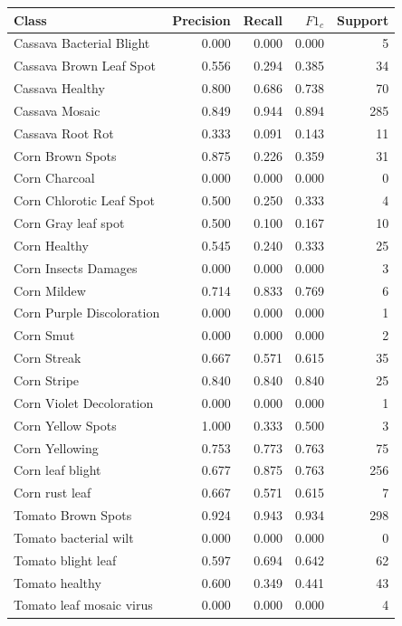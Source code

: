 \documentclass[a4paper,8pt]{article}
\begin{document}
\begin{table}[H]
\centering
\scriptsize
\renewcommand{\arraystretch}{1.1}
\begin{tabularx}{0.92\textwidth}{|>{\raggedright\arraybackslash}X|r|r|r|r|}
\hline
\textbf{Class} & \textbf{Precision} & \textbf{Recall} & \textbf{$F1_c$} & \textbf{Support}\\
\hline
Cassava Bacterial Blight & 0.000 & 0.000 & 0.000 & 5\\
Cassava Brown Leaf Spot & 0.556 & 0.294 & 0.385 & 34\\
Cassava Healthy & 0.800 & 0.686 & 0.738 & 70\\
Cassava Mosaic & 0.849 & 0.944 & 0.894 & 285\\
Cassava Root Rot & 0.333 & 0.091 & 0.143 & 11\\
Corn Brown Spots & 0.875 & 0.226 & 0.359 & 31\\
Corn Charcoal & 0.000 & 0.000 & 0.000 & 0\\
Corn Chlorotic Leaf Spot & 0.500 & 0.250 & 0.333 & 4\\
Corn Gray leaf spot & 0.500 & 0.100 & 0.167 & 10\\
Corn Healthy & 0.545 & 0.240 & 0.333 & 25\\
Corn Insects Damages & 0.000 & 0.000 & 0.000 & 3\\
Corn Mildew & 0.714 & 0.833 & 0.769 & 6\\
Corn Purple Discoloration & 0.000 & 0.000 & 0.000 & 1\\
Corn Smut & 0.000 & 0.000 & 0.000 & 2\\
Corn Streak & 0.667 & 0.571 & 0.615 & 35\\
Corn Stripe & 0.840 & 0.840 & 0.840 & 25\\
Corn Violet Decoloration & 0.000 & 0.000 & 0.000 & 1\\
Corn Yellow Spots & 1.000 & 0.333 & 0.500 & 3\\
Corn Yellowing & 0.753 & 0.773 & 0.763 & 75\\
Corn leaf blight & 0.677 & 0.875 & 0.763 & 256\\
Corn rust leaf & 0.667 & 0.571 & 0.615 & 7\\
Tomato Brown Spots & 0.924 & 0.943 & 0.934 & 298\\
Tomato bacterial wilt & 0.000 & 0.000 & 0.000 & 0\\
Tomato blight leaf & 0.597 & 0.694 & 0.642 & 62\\
Tomato healthy & 0.600 & 0.349 & 0.441 & 43\\
Tomato leaf mosaic virus & 0.000 & 0.000 & 0.000 & 4\\

\end{tabularx}
\end{table}
\end{document}
